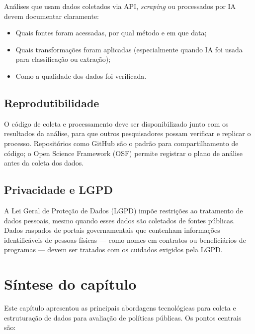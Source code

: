 Análises que usam dados coletados via API, \textit{scraping} ou processados por IA devem documentar claramente:

\begin{itemize}
  \item Quais fontes foram acessadas, por qual método e em que data;
  \item Quais transformações foram aplicadas (especialmente quando IA foi usada para classificação ou extração);
  \item Como a qualidade dos dados foi verificada.
\end{itemize}

\subsection{Reprodutibilidade}

O código de coleta e processamento deve ser disponibilizado junto com os resultados da análise, para que outros pesquisadores possam verificar e replicar o processo. Repositórios como GitHub são o padrão para compartilhamento de código; o Open Science Framework (OSF) permite registrar o plano de análise antes da coleta dos dados.

\subsection{Privacidade e LGPD}

A Lei Geral de Proteção de Dados (LGPD) impõe restrições ao tratamento de dados pessoais, mesmo quando esses dados são coletados de fontes públicas. Dados raspados de portais governamentais que contenham informações identificáveis de pessoas físicas --- como nomes em contratos ou beneficiários de programas --- devem ser tratados com os cuidados exigidos pela LGPD.

\section{Síntese do capítulo}

Este capítulo apresentou as principais abordagens tecnológicas para coleta e estruturação de dados para avaliação de políticas públicas. Os pontos centrais são:

